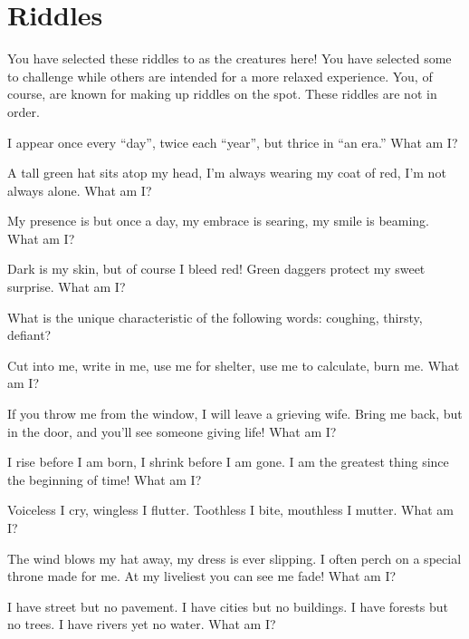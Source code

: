 \documentclass[green]{guildcamp2}
\begin{document}
\name{\gsphinxriddles{}}

\section{Riddles}
You have selected these riddles to as the creatures here! You have selected some to challenge while others are intended for a more relaxed experience. You, of course, are known for making up riddles on the spot. These riddles are not in order.

\begin{enum}
	\item I appear once every ``day'', twice each ``year'', but thrice in ``an era.'' What am I?
	
	\item A tall green hat sits atop my head, I'm always wearing my coat of red, I'm not always alone. What am I?
	
	\item My presence is but once a day, my embrace is searing, my smile is beaming. What am I?
	
	\item Dark is my skin, but of course I bleed red! Green daggers protect my sweet surprise. What am I?
	
	\item What is the unique characteristic of the following words: coughing, thirsty, defiant?
	
	\item Cut into me, write in me, use me for shelter, use me to calculate, burn me. What am I?
	
	\item If you throw me from the window, I will leave a grieving wife. Bring me back, but in the door, and you'll see someone giving life! What am I?
	
	\item I rise before I am born, I shrink before I am gone. I am the greatest thing since the beginning of time! What am I?
	
	\item Voiceless I cry, wingless I flutter. Toothless I bite, mouthless I mutter. What am I?
	
	\item The wind blows my hat away, my dress is ever slipping. I often perch on a special throne made for me. At my liveliest you can see me fade! What am I?
	
	\item I have street but no pavement. I have cities but no buildings. I have forests but no trees. I have rivers yet no water. What am I?
	

\end{enum}
\end{document}
